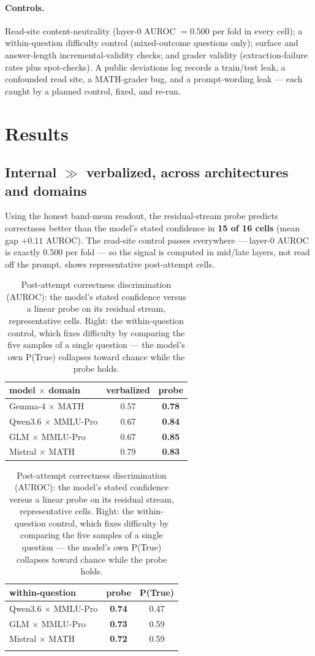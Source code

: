\documentclass{article}
\begin{document}
\paragraph{Controls.}
Read-site content-neutrality (layer-0 AUROC $= 0.500$ per fold in every cell); a within-question difficulty control (mixed-outcome questions only); surface and answer-length incremental-validity checks; and grader validity (extraction-failure rates plus spot-checks).
A public deviations log records a train/test leak, a confounded read site, a MATH-grader bug, and a prompt-wording leak --- each caught by a planned control, fixed, and re-run.

\section{Results}
\label{sec:results}

\subsection{Internal $\gg$ verbalized, across architectures and domains}

Using the honest band-mean readout, the residual-stream probe predicts correctness better than the model's stated confidence in \textbf{15 of 16 cells} (mean gap $\mathbf{+0.11}$ AUROC).
The read-site control passes everywhere --- layer-0 AUROC is exactly 0.500 per fold --- so the signal is computed in mid/late layers, not read off the prompt.
 shows representative post-attempt cells.

\begin{table}[t]
\caption{Post-attempt correctness discrimination (AUROC): the model's stated confidence versus a linear probe on its residual stream, representative cells. Right: the within-question control, which fixes difficulty by comparing the five samples of a single question --- the model's own P(True) collapses toward chance while the probe holds.}
\label{tab:headline}
\centering
\small
\begin{tabular}{lcc}
\toprule
\textbf{model $\times$ domain} & \textbf{verbalized} & \textbf{probe} \\
\midrule
Gemma-4 $\times$ MATH & 0.57 & \textbf{0.78} \\
Qwen3.6 $\times$ MMLU-Pro & 0.67 & \textbf{0.84} \\
GLM $\times$ MMLU-Pro & 0.67 & \textbf{0.85} \\
Mistral $\times$ MATH & 0.79 & \textbf{0.83} \\
\bottomrule
\end{tabular}
\hspace{1.5em}
\begin{tabular}{lcc}
\toprule
\textbf{within-question} & \textbf{probe} & \textbf{P(True)} \\
\midrule
Qwen3.6 $\times$ MMLU-Pro & \textbf{0.74} & 0.47 \\
GLM $\times$ MMLU-Pro & \textbf{0.73} & 0.59 \\
Mistral $\times$ MATH & \textbf{0.72} & 0.59 \\
\\[-0.85em]
\bottomrule
\end{tabular}
\end{table}
\end{document}
